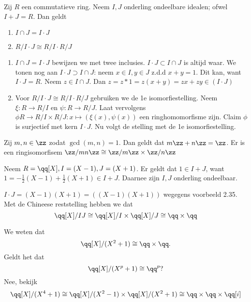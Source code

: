\documentclass[a4paper,12pt,oneside]{book}
\begin{document}
\begin{stelling}
Zij $R$ een commutatieve ring. Neem $I,J$ onderling ondeelbare idealen; ofwel $I+J = R$. Dan geldt
\begin{enumerate}[label=(\roman*)]
\item $I \cap J = I\cdot J$
\item $R/I\cdot J \cong R/I \cdot R/J$
\end{enumerate}
\end{stelling}
\begin{bewijs}
\begin{enumerate}[label=(\roman*)]
\item $I \cap J = I\cdot J$ bewijzen we met twee inclusies. $I \cdot J \subset I \cap J$ is altijd waar. We tonen nog aan $I \cdot J \supset I \cap J$: neem $x \in I, y \in J$ z.d.d $x + y = 1$. Dit kan, want $I\cdot J = R$. Neem $z \in I \cap J$. Dan $z = z*1 = z(x+y) = zx + zy \in (I\cdot J)$
\item Voor $R/I\cdot J \cong R/I \cdot R/J$ gebruiken we de 1e isomorfiestelling. Neem $\xi : R \to R/I$ en $\psi :  R \to R/J$. Laat vervolgens $\phi R \to R/I \times R/J :  x \mapsto (\xi(x), \psi(x))$ een ringhomomorfisme zijn. Claim $\phi$ is surjectief met kern $I \cdot J$. Nu volgt de stelling met de 1e isomorfiestelling.
\end{enumerate}
\end{bewijs}

\begin{gevolg}
Zij $m,n \in \zz$ zodat $\gcd (m,n) = 1$. Dan geldt dat $m\zz + n\zz = \zz$. Er is een ringisomorfisem $\zz/mn\zz \cong \zz/m\zz \times \zz/n\zz$
\end{gevolg}

\begin{voorbeeld}
Neem $R = \qq[X], I= (X-1), J =(X+1)$. Er geldt dat $1 \in I + J$, want $1 = -\frac{1}{2}(X-1) + \frac{1}{2}(X+1) \in I+J$. Daarnee zijn $I, J$ onderling ondeelbaar. 

$I\cdot J = (X-1)(X+1) = ((X-1)(X+1))$ wegegens voorbeeld 2.35. Met de Chineese reststelling hebben we dat
$$\qq[X]/IJ \cong \qq[X]/I \times \qq[X]/J \cong \qq \times \qq $$
\end{voorbeeld}

\begin{voorbeeld}
We weten dat 
\[
\qq[X]/(X^2+1) \cong \qq \times \qq.
\]
Geldt het dat
\[
\qq[X]/(X^p+1) \cong \qq^p?
\]
Nee, bekijk
\[
\qq[X]/(X^4+1) \cong \qq[X]/(X^2-1) \times \qq[X]/(X^2+1) \cong \qq \times \qq \times \qq[i]
\]
\end{voorbeeld}
\end{document}

